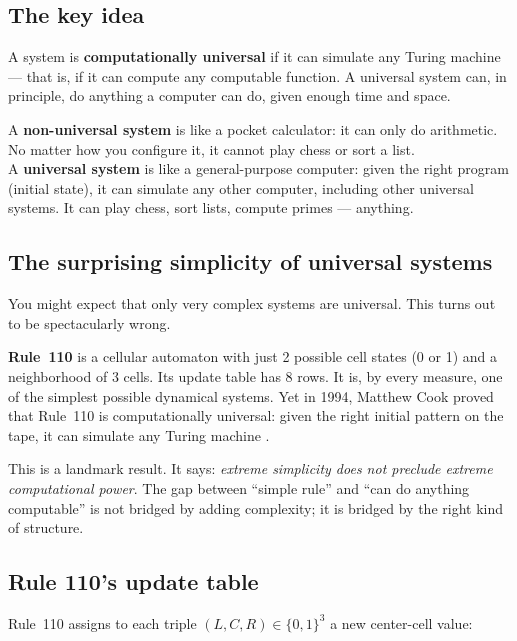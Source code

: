 \documentclass[11pt,a4paper]{article}
\newcommand{\term}[1]{\textbf{#1}}
\begin{document}
\subsection{The key idea}

A system is \term{computationally universal} if it can simulate any Turing machine —
that is, if it can compute any computable function.  A universal system can, in
principle, do anything a computer can do, given enough time and space.

\begin{tcolorbox}[colback=boxorange,colframe=orange!60!black,title=The analogy]
A \textbf{non-universal system} is like a pocket calculator: it can only do arithmetic.
No matter how you configure it, it cannot play chess or sort a list.\\[4pt]
A \textbf{universal system} is like a general-purpose computer: given the right program
(initial state), it can simulate any other computer, including other universal systems.
It can play chess, sort lists, compute primes — anything.
\end{tcolorbox}

\subsection{The surprising simplicity of universal systems}

You might expect that only very complex systems are universal.  This turns out to be
spectacularly wrong.

\term{Rule~110} is a cellular automaton with just 2 possible cell states (0 or 1) and
a neighborhood of 3 cells.  Its update table has 8 rows.  It is, by every measure, one
of the simplest possible dynamical systems.  Yet in 1994, Matthew Cook proved that
Rule~110 is computationally universal: given the right initial pattern on the tape,
it can simulate any Turing machine \cite{Cook2004}.

This is a landmark result.  It says: \emph{extreme simplicity does not preclude
extreme computational power}.  The gap between ``simple rule'' and ``can do anything
computable'' is not bridged by adding complexity; it is bridged by the right kind
of structure.

\subsection{Rule 110's update table}

Rule~110 assigns to each triple $(L, C, R) \in \{0,1\}^3$ a new center-cell value:
\end{document}
